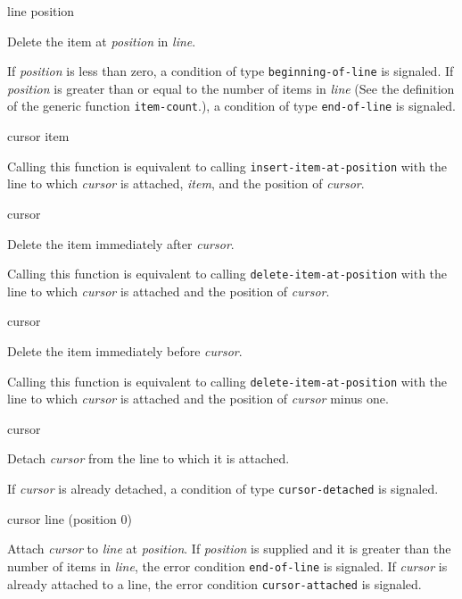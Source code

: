  {line position}

Delete the item at \textit{position} in \textit{line}.

If \textit{position} is less than zero, a condition of type
\texttt{beginning-of-line} is signaled.  If \textit{position} is
greater than or equal to the number of items in \textit{line} (See the
definition of the generic function \texttt{item-count}.), a condition
of type \texttt{end-of-line} is signaled.

 {cursor item}

Calling this function is equivalent to calling
\texttt{insert-item-at-position} with the line to which
\textit{cursor} is attached, \textit{item}, and the position of
\textit{cursor}.  \howeverperformance{}

\ifdetached{}

 {cursor}

Delete the item immediately after \emph{cursor}.

Calling this function is equivalent to calling
\texttt{delete-item-at-position} with the line to which
\textit{cursor} is attached and the position of \textit{cursor}.
\howeverperformance{}

\ifdetached{}

 {cursor}

Delete the item immediately before \emph{cursor}.

Calling this function is equivalent to calling
\texttt{delete-item-at-position} with the line to which
\textit{cursor} is attached and the position of \textit{cursor} minus
one.  \howeverperformance{}

\ifdetached{}

 {cursor}

Detach \textit{cursor} from the line to which it is attached.

If \textit{cursor} is already detached, a condition of type
\texttt{cursor-detached} is signaled.

 {cursor line \optional (position 0)}

Attach \textit{cursor} to \textit{line} at \textit{position}.  If
\textit{position} is supplied and it is greater than the number of
items in \textit{line}, the error condition \texttt{end-of-line} is
signaled.  If \textit{cursor} is already attached to a line, the error
condition \texttt{cursor-attached} is signaled.

